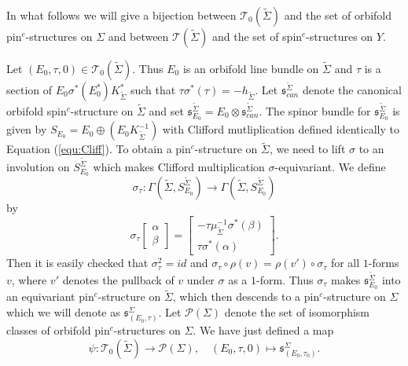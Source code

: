 \documentclass{amsart}
\theoremstyle{definition}
\theoremstyle{remark}
\numberwithin{equation}{section}
\begin{document}
In what follows we will give a bijection between $\mathcal{T}_0(\widetilde{\Sigma})$ and the set of orbifold pin$^c$-structures on $\Sigma$ and between $\mathcal{T}(\widetilde{\Sigma})$ and the set of spin$^c$-structures on $Y$.

Let $(E_0 , \tau , 0 ) \in \mathcal{T}_0(\widetilde{\Sigma})$. Thus $E_0$ is an orbifold line bundle on $\widetilde{\Sigma}$ and $\tau$ is a section of $E_0 \sigma^*(E_0^*) K_{\widetilde{\Sigma}}^*$ such that $\tau \sigma^*(\tau) = -h_{\widetilde{\Sigma}}$. Let $\mathfrak{s}_{can}^{\widetilde{\Sigma}}$ denote the canonical orbifold spin$^c$-structure on $\widetilde{\Sigma}$ and set $\mathfrak{s}^{\widetilde{\Sigma}}_{E_0} = E_0 \otimes \mathfrak{s}_{can}^{\widetilde{\Sigma}}$. The spinor bundle for $\mathfrak{s}_{E_0}^{\widetilde{\Sigma}}$ is given by $S_{E_0} = E_0 \oplus (E_0 K_{\widetilde{\Sigma}}^{-1})$ with Clifford mutliplication defined identically to Equation (\ref{equ:Cliff}). To obtain a pin$^c$-structure on $\widetilde{\Sigma}$, we need to lift $\sigma$ to an involution on $S^{\widetilde{\Sigma}}_{E_0}$ which makes Clifford multiplication $\sigma$-equivariant. We define
\[
\sigma_{\tau} : \Gamma( \widetilde{\Sigma} , S^{\widetilde{\Sigma}}_{E_0} ) \to \Gamma( \widetilde{\Sigma} , S^{\widetilde{\Sigma}}_{E_0})
\]
by
\[
\sigma_{\tau} \left[ \begin{matrix} \alpha \\ \beta \end{matrix} \right] = \left[ \begin{matrix} -\tau \mu_{\widetilde{\Sigma}}^{-1} \sigma^*(\beta) \\ \tau \sigma^*(\alpha) \end{matrix} \right].
\]
Then it is easily checked that $\sigma_{\tau}^2 = id$ and $\sigma_{\tau} \circ \rho(v) = \rho( v' ) \circ \sigma_{\tau}$ for all $1$-forms $v$, where $v'$ denotes the pullback of $v$ under $\sigma$ as a $1$-form. Thus $\sigma_{\tau}$ makes $\mathfrak{s}^{\widetilde{\Sigma}}_{E_0}$ into an equivariant pin$^c$-structure on $\widetilde{\Sigma}$, which then descends to a pin$^c$-structure on $\Sigma$ which we will denote as $\mathfrak{s}^\Sigma_{(E_0,\tau)}$. Let $\mathcal{P}(\Sigma)$ denote the set of isomorphism classes of orbifold pin$^c$-structures on $\Sigma$. We have just defined a map
\begin{equation}\label{equ:pinc}
\psi : \mathcal{T}_0(\widetilde{\Sigma}) \to \mathcal{P}(\Sigma), \quad (E_0 , \tau , 0) \mapsto \mathfrak{s}^{\Sigma}_{(E_0 , \tau_0)}.
\end{equation}
\end{document}
